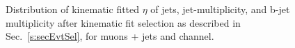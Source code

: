 \begin{figure}
    \caption{Distribution of kinematic fitted $\eta$ of jets, jet-multiplicity, and b-jet
        multiplicity after kinematic fit selection as described
        in Sec.~\ref{s:secEvtSel}, for muons + jets and \ejets
    channel.}
    \label{fig:kfitPlot2}
\end{figure}

